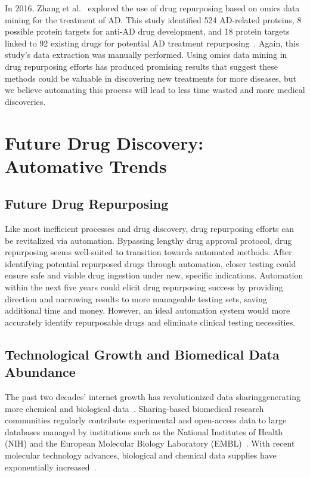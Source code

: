 \documentclass{IEEEtran}
\begin{document}
	In 2016, Zhang et al.~\cite{zhang16} explored the use of drug repurposing based on omics data mining for the treatment of AD.  This study identified 524 AD-related proteins, 8 possible protein targets for anti-AD drug development, and 18 protein targets linked to 92 existing drugs for potential AD treatment repurposing~\cite{zhang16}.  Again, this study's data extraction was manually performed.  Using omics data mining in drug repurposing efforts has produced promising results that suggest these methods could be valuable in discovering new treatments for more diseases, but we believe automating this process will lead to less time wasted and more medical discoveries.
	
	\section{Future Drug Discovery: Automative Trends}
	\subsection{Future Drug Repurposing}
	Like most inefficient processes and drug discovery, drug repurposing efforts can be revitalized via automation. Bypassing lengthy drug approval protocol, drug repurposing seems well-suited to transition towards automated methods. After identifying potential repurposed drugs through automation, closer testing could ensure safe and viable drug ingestion under new, specific indications.  Automation within the next five years could elicit drug repurposing success by providing direction and narrowing results to more manageable testing sets, saving additional time and money. However, an ideal automation system would more accurately identify repurposable drugs and eliminate clinical testing necessities. 
	
	\subsection{Technological Growth and Biomedical Data Abundance} \label{tgbd}
	The past two decades' internet growth has revolutionized data sharing\textemdash generating more chemical and biological data~\cite{boguski}.  Sharing-based biomedical research communities regularly contribute experimental and open-access data to large databases managed by institutions such as the National Institutes of Health (NIH) and the European Molecular Biology Laboratory (EMBL)~\cite{youtube}. With recent molecular technology advances, biological and chemical data supplies have exponentially increased~\cite{cook}.
		
\end{document}
